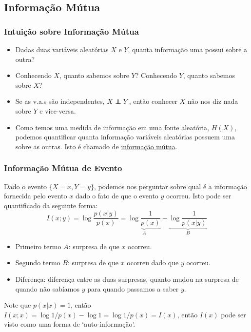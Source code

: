 \subsection{Informação Mútua}
\begin{frame}%
  \frametitle{Intuição sobre Informação Mútua}
  \begin{itemize}
  \item Dadas duas variáveis aleatórias $X$ e $Y$, quanta informação uma possui sobre a outra?
  \item Conhecendo $X$, quanto sabemos sobre $Y$? Conhecendo $Y$, quanto sabemos sobre $X$?
  \item Se as v.a.s são independentes, $X \independent Y$, então conhecer $X$ não nos diz nada sobre
  $Y$ e vice-versa.
  \item Como temos uma medida de informação em uma fonte aleatória, $H(X)$, podemos quantificar
  quanta informação variáveis aleatórias possuem uma sobre as outras. Isto é chamado de 
  \underline{informação mútua}.
  \end{itemize}
\end{frame}

\begin{frame}%
  \frametitle{Informação Mútua de Evento}
  Dado o evento $\{X=x, Y=y\}$, podemos nos perguntar sobre qual é a informação fornecida
  pelo evento $x$ dado o fato de que o evento $y$ ocorreu. Isto pode ser quantificado da seguinte forma:
  \begin{equation}
  I(x;y) = \log \frac{p(x|y)}{p(x)} = \underbrace{\log \frac{1}{p(x)}}_{A} - \underbrace{\log \frac{1}{p(x|y)}}_{B}
  \end{equation}
  
  \begin{itemize}
  \item Primeiro termo $A$: surpresa de que $x$ ocorreu.
  \item Segundo termo $B$: surpresa de que $x$ ocorreu dado que $y$ ocorreu.
  \item Diferença: diferença entre as duas surpresas, quanto mudou na surpresa de quando
  não sabíamos $y$ para quando passamos a saber $y$.
  \end{itemize}

  Note que $p(x|x)=1$, então $I(x;x) = \log 1/p(x) - \log 1 = \log 1/p(x) = I(x)$, então
  $I(x)$ pode ser visto como uma forma de `auto-informação'.
\end{frame}


